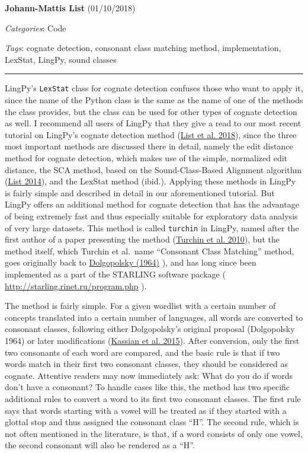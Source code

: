\documentclass[
  english,
  a4paper,
  oneside,tablecaptionabove
]{scrbook}
\newcommand{\passthrough}[1]{#1}
\begin{document}
\textbf{Johann-Mattis List} (01/10/2018)

\emph{Categories}: Code

\emph{Tags}: cognate detection, consonant class matching method,
implementation, LexStat, LingPy, sound classes

\begin{center}\rule{0.5\linewidth}{\linethickness}\end{center}

LingPy's \passthrough{\lstinline!LexStat!} class for cognate detection
confuses those who want to apply it, since the name of the Python class
is the same as the name of one of the methods the class provides, but
the class can be used for other types of cognate detection as well. I
recommend all users of LingPy that they give a read to our most recent
tutorial on LingPy's cognate detection method (\href{http://bibliography.lingpy.org?key=List2018d}{List et al. 2018}),
since the three most important methods are discussed there in detail,
namely the edit distance method for cognate detection, which makes use
of the simple, normalized edit distance, the SCA method, based on the
Sound-Class-Based Alignment algorithm (\href{http://bibliography.lingpy.org?key=List2014d}{List 2014}), and
the LexStat method (ibid.). Applying these methods in LingPy is fairly
simple and described in detail in our aforementioned tutorial. But
LingPy offers an additional method for cognate detection that has the
advantage of being extremely fast and thus especially suitable for
exploratory data analysis of very large datasets. This method is called
\passthrough{\lstinline!turchin!} in LingPy, named after the first
author of a paper presenting the method (\href{http://bibliography.lingpy.org?key=Turchin2010}{Turchin et al.
2010}), but the method itself, which Turchin et al.~name
\enquote{Consonant Class Matching} method, goes originally back to
\href{http://bibliography.lingpy.org?key=Dolgopolsky1964}{Dolgopolsky
(1964)} ), and has long since been implemented as a part of the STARLING
software package (
\href{http://starling.rinet.ru/program.php?lan=en}{http://starling.rinet.ru/program.php}
). \protect\hypertarget{more-477}{}{}

The method is fairly simple. For a given wordlist with a certain number
of concepts translated into a certain number of languages, all words are
converted to consonant classes, following either Dolgopolsky's original
proposal (Dolgopolsky 1964) or later modifications (\href{http://bibliography.lingpy.org?key=Kassian2015b}{Kassian et al.
2015}). After conversion, only the first two consonants of each word
are compared, and the basic rule is that if two words match in their
first two consonant classes, they should be considered as cognate.
Attentive readers may now immediately ask: What do you do if words don't
have a consonant? To handle cases like this, the method has two specific
additional rules to convert a word to its first two consonant classes.
The first rule says that words starting with a vowel will be treated as
if they started with a glottal stop and thus assigned the consonant
class \enquote{H}. The second rule, which is not often mentioned in the
literature, is that, if a word consists of only one vowel, the second
consonant will also be rendered as a \enquote{H}.
\end{document}
